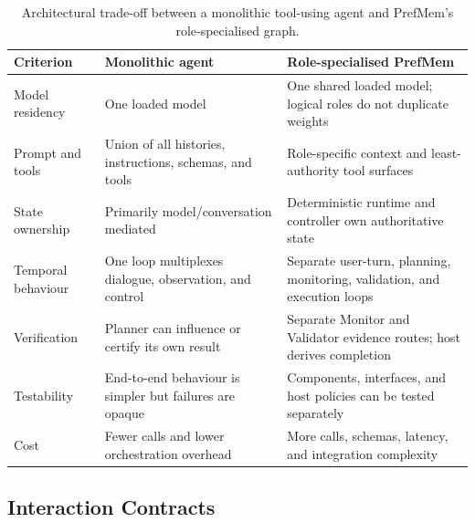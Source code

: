 \begin{table}[H]
    \centering
    \small
    \caption{Architectural trade-off between a monolithic tool-using agent and
    PrefMem's role-specialised graph.}
    \label{tab:architecture-alternatives}
    \begin{tabular}{@{}P{3.1cm}P{5.5cm}P{5.5cm}@{}}
        \toprule
        \textbf{Criterion} & \textbf{Monolithic agent} &
        \textbf{Role-specialised PrefMem} \\
        \midrule
        Model residency & One loaded model & One shared loaded model; logical
        roles do not duplicate weights \\
        Prompt and tools & Union of all histories, instructions, schemas, and
        tools & Role-specific context and least-authority tool surfaces \\
        State ownership & Primarily model/conversation mediated & Deterministic
        runtime and controller own authoritative state \\
        Temporal behaviour & One loop multiplexes dialogue, observation, and
        control & Separate user-turn, planning, monitoring, validation, and
        execution loops \\
        Verification & Planner can influence or certify its own result &
        Separate Monitor and Validator evidence routes; host derives completion \\
        Testability & End-to-end behaviour is simpler but failures are opaque &
        Components, interfaces, and host policies can be tested separately \\
        Cost & Fewer calls and lower orchestration overhead & More calls,
        schemas, latency, and integration complexity \\
        \bottomrule
    \end{tabular}
\end{table}

\subsection{Interaction Contracts}

